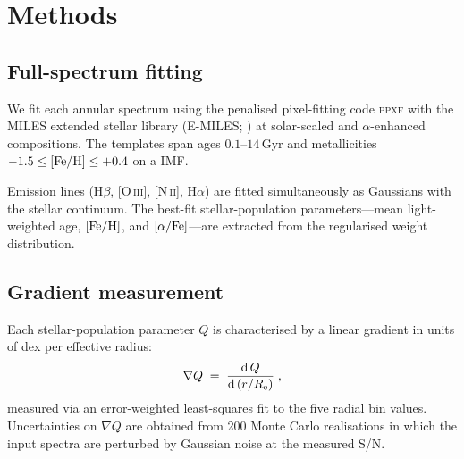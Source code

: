 \section{Methods}
\label{sec:methods}

\subsection{Full-spectrum fitting}

We fit each annular spectrum using the penalised pixel-fitting code
\textsc{ppxf} \citep{Cappellari2017} with the MILES extended stellar
library (E-MILES; \citealt{Vazdekis2016}) at solar-scaled and
$\alpha$-enhanced compositions.
The templates span ages $0.1$--$14\,\mathrm{Gyr}$ and metallicities
$-1.5 \le [\mathrm{Fe/H}] \le +0.4$ on a \citet{Kroupa2001} IMF.

Emission lines (H$\beta$, [O\,\textsc{iii}], [N\,\textsc{ii}], H$\alpha$)
are fitted simultaneously as Gaussians with the stellar continuum.
The best-fit stellar-population parameters---mean light-weighted age,
$[\mathrm{Fe/H}]$, and $[\alpha/\mathrm{Fe}]$---are extracted from the regularised weight
distribution.

\subsection{Gradient measurement}

Each stellar-population parameter $Q$ is characterised by a linear
gradient in units of dex per effective radius:
\begin{equation}
  \nabla Q \;=\;
  \frac{\mathrm{d}\,Q}{\mathrm{d}\,(r/R_{\mathrm{e}})} \;,
  \label{eq:gradient}
\end{equation}
measured via an error-weighted least-squares fit to the five radial
bin values.
Uncertainties on $\nabla Q$ are obtained from 200 Monte Carlo
realisations in which the input spectra are perturbed by Gaussian
noise at the measured S/N.

